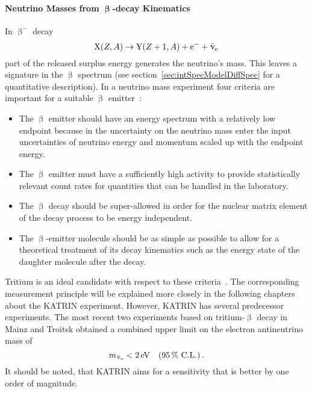\paragraph{Neutrino Masses from $\boldsymbol{\upbeta}$-decay Kinematics} 
In $\upbeta^-$ decay
\begin{equation}
    \ce{X}(Z,A) \rightarrow \ce{Y}(Z+1,A) + \ce{e^-} + \aeneutrino
\end{equation}
part of the released surplus energy generates the neutrino's mass. This leaves a signature in the $\upbeta$ spectrum (see section~\ref{sec:intSpecModelDiffSpec} for a quantitative description). In a neutrino mass experiment four criteria are important for a suitable $\upbeta$ emitter~\cite{Otten:2008zz}:
\begin{itemize}
	\item The $\upbeta$ emitter should have an energy spectrum with a relatively low endpoint because in the uncertainty on the neutrino mass enter the input uncertainties of neutrino energy and	momentum scaled up with the endpoint energy.
	\item The $\upbeta$ emitter must have a sufficiently high activity to provide statistically relevant count rates for quantities that can be handled in the laboratory.
	\item The $\upbeta$ decay should be super-allowed in order for the nuclear matrix element of the decay process to be energy independent.
	\item The $\upbeta$-emitter molecule should be as simple as possible to allow for a theoretical treatment of its decay kinematics such as the energy state of the daughter molecule after the decay.
\end{itemize}
Tritium is an ideal candidate with respect to these criteria~\cite{Otten:2008zz}. The corresponding measurement principle will be explained more closely in the following chapters about the KATRIN experiment. However, KATRIN has several predecessor experiments. The most recent two experiments based on tritium-$\upbeta$ decay in Mainz and Troitsk obtained a combined upper limit on the electron antineutrino mass of~\cite{Kraus2005, Aseev:2011dq, ReviewOfParticlePhysics}
\begin{equation*}
    m_{\bar{\upnu}_{\mathrm{e}}} < \SI{2}{eV} \quad (\SI{95}{\percent} \text{ C.L.}) \text{\,.} 
\end{equation*}
It should be noted, that KATRIN aims for a sensitivity that is better by one order of magnitude.
\FloatBarrier
